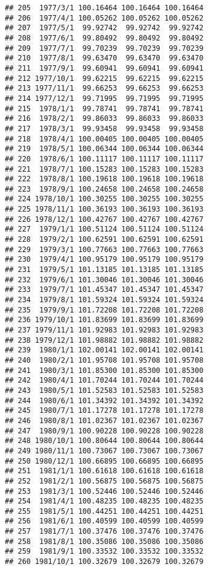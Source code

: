 \documentclass[
]{article}
\begin{document}
\begin{verbatim}
## 205  1977/3/1 100.16464 100.16464 100.16464
## 206  1977/4/1 100.05262 100.05262 100.05262
## 207  1977/5/1  99.92742  99.92742  99.92742
## 208  1977/6/1  99.80492  99.80492  99.80492
## 209  1977/7/1  99.70239  99.70239  99.70239
## 210  1977/8/1  99.63470  99.63470  99.63470
## 211  1977/9/1  99.60941  99.60941  99.60941
## 212 1977/10/1  99.62215  99.62215  99.62215
## 213 1977/11/1  99.66253  99.66253  99.66253
## 214 1977/12/1  99.71995  99.71995  99.71995
## 215  1978/1/1  99.78741  99.78741  99.78741
## 216  1978/2/1  99.86033  99.86033  99.86033
## 217  1978/3/1  99.93458  99.93458  99.93458
## 218  1978/4/1 100.00405 100.00405 100.00405
## 219  1978/5/1 100.06344 100.06344 100.06344
## 220  1978/6/1 100.11117 100.11117 100.11117
## 221  1978/7/1 100.15283 100.15283 100.15283
## 222  1978/8/1 100.19618 100.19618 100.19618
## 223  1978/9/1 100.24658 100.24658 100.24658
## 224 1978/10/1 100.30255 100.30255 100.30255
## 225 1978/11/1 100.36193 100.36193 100.36193
## 226 1978/12/1 100.42767 100.42767 100.42767
## 227  1979/1/1 100.51124 100.51124 100.51124
## 228  1979/2/1 100.62591 100.62591 100.62591
## 229  1979/3/1 100.77663 100.77663 100.77663
## 230  1979/4/1 100.95179 100.95179 100.95179
## 231  1979/5/1 101.13185 101.13185 101.13185
## 232  1979/6/1 101.30046 101.30046 101.30046
## 233  1979/7/1 101.45347 101.45347 101.45347
## 234  1979/8/1 101.59324 101.59324 101.59324
## 235  1979/9/1 101.72208 101.72208 101.72208
## 236 1979/10/1 101.83699 101.83699 101.83699
## 237 1979/11/1 101.92983 101.92983 101.92983
## 238 1979/12/1 101.98882 101.98882 101.98882
## 239  1980/1/1 102.00141 102.00141 102.00141
## 240  1980/2/1 101.95708 101.95708 101.95708
## 241  1980/3/1 101.85300 101.85300 101.85300
## 242  1980/4/1 101.70244 101.70244 101.70244
## 243  1980/5/1 101.52583 101.52583 101.52583
## 244  1980/6/1 101.34392 101.34392 101.34392
## 245  1980/7/1 101.17278 101.17278 101.17278
## 246  1980/8/1 101.02367 101.02367 101.02367
## 247  1980/9/1 100.90228 100.90228 100.90228
## 248 1980/10/1 100.80644 100.80644 100.80644
## 249 1980/11/1 100.73067 100.73067 100.73067
## 250 1980/12/1 100.66895 100.66895 100.66895
## 251  1981/1/1 100.61618 100.61618 100.61618
## 252  1981/2/1 100.56875 100.56875 100.56875
## 253  1981/3/1 100.52446 100.52446 100.52446
## 254  1981/4/1 100.48235 100.48235 100.48235
## 255  1981/5/1 100.44251 100.44251 100.44251
## 256  1981/6/1 100.40599 100.40599 100.40599
## 257  1981/7/1 100.37476 100.37476 100.37476
## 258  1981/8/1 100.35086 100.35086 100.35086
## 259  1981/9/1 100.33532 100.33532 100.33532
## 260 1981/10/1 100.32679 100.32679 100.32679

\end{verbatim}
\end{document}
